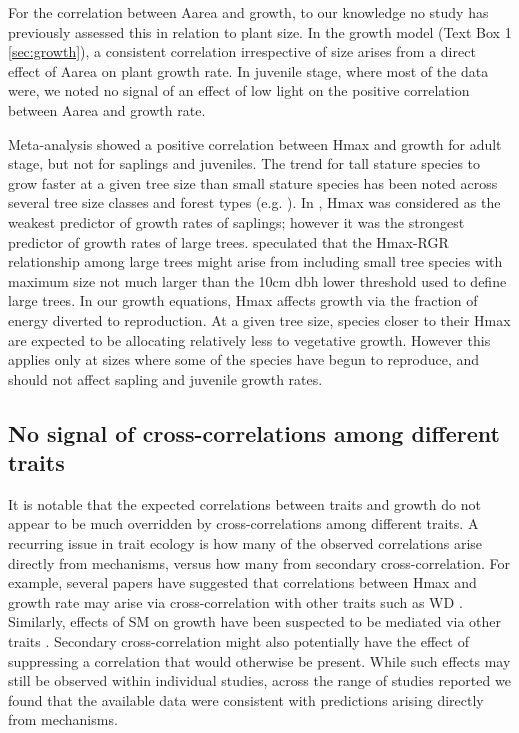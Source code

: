 \documentclass[a4paper]{article}\usepackage[]{graphicx}\usepackage[]{color}
\begin{document}
For the correlation between Aarea and growth, to our knowledge no study has previously assessed this in relation to plant size. In the growth model (Text Box 1 \ref{sec:growth}), a consistent correlation irrespective of size arises from a direct effect of Aarea on plant growth rate. In juvenile stage, where most of the data were, we noted no signal of an effect of low light on the positive correlation between Aarea and growth rate.

Meta-analysis showed a positive correlation between Hmax and growth for adult stage, but not for saplings and juveniles. The trend for tall stature species to grow faster at a given tree size than small stature species has been noted across several tree size classes and forest types (e.g. \citealt{Poorter:2008iu,Wright:2010tp,Herault:2011dd,Ruger:2012jv,Iida:2014ep}). In \citet{Wright:2010tp}, Hmax was considered as the weakest predictor of growth rates of saplings; however it was the strongest predictor of growth rates of large trees. \citet{Poorter:2008iu} speculated that the Hmax-RGR relationship among large trees might arise from including small tree species with maximum size not much larger than the  10cm dbh lower threshold used to define large trees. In our growth equations, Hmax affects growth via the fraction of energy diverted to reproduction. At a given tree size, species closer to their Hmax are expected to be allocating relatively less to vegetative growth. However this applies only at sizes where some of the species have begun to reproduce, and should not affect sapling and juvenile growth rates. 

\subsection*{No signal of cross-correlations among different traits}

It is notable that the expected correlations between traits and growth do not appear to be much overridden by cross-correlations among different traits. A recurring issue in trait ecology is how many of the observed correlations arise directly from mechanisms, versus how many from secondary cross-correlation. For example, several papers have suggested that correlations between Hmax and growth rate may arise via cross-correlation with other traits such as WD \citep{Thomas:1996do, Poorter:2006vb, Wright:2010tp}. Similarly, effects of SM on growth have been suspected to be mediated via other traits \citep{Shipley:1990js,Westoby:2002ft,Poorter:2006vb}. Secondary cross-correlation might also potentially have the effect of suppressing a correlation that would otherwise be present. While such effects may still be observed within individual studies, across the range of studies reported we found that the available data were consistent with predictions arising directly from mechanisms. 
\end{document}
